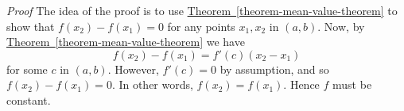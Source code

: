 \documentclass[10pt,]{book}
\makeatletter
\renewcommand*{\proofname}{Proof}
\renewenvironment{proof}[1][\proofname]{\par
  \pushQED{\qed}%
  \normalfont \topsep6\p@\@plus6\p@\relax
  \trivlist
  \item\relax
    {\itshape
    #1\@addpunct{.}}\hspace\labelsep\ignorespaces
}{%
  \popQED\endtrivlist\@endpefalse
}
\numberwithin{equation}{section}
\makeatother
\begin{document}
\begin{proof}\hypertarget{proof-8}{}
\hypertarget{p-345}{}%
The idea of the proof is to use \hyperref[theorem-mean-value-theorem]{Theorem~\ref{theorem-mean-value-theorem}} to show that \(f(x_{2}) - f(x_{1}) = 0\) for any points \(x_{1},x_{2}\) in \((a,b)\). Now, by \hyperref[theorem-mean-value-theorem]{Theorem~\ref{theorem-mean-value-theorem}} we have%
\begin{equation*}
f(x_{2}) - f(x_{1}) = f'(c)(x_{2}-x_{1})
\end{equation*}
for some \(c\) in \((a,b)\). However, \(f'(c) = 0\) by assumption, and so \(f(x_{2}) - f(x_{1}) = 0\). In other words, \(f(x_{2}) = f(x_{1})\). Hence \(f\) must be constant.%
\end{proof}
%
%
\typeout{************************************************}
\typeout{************************************************}
%
\end{document}
